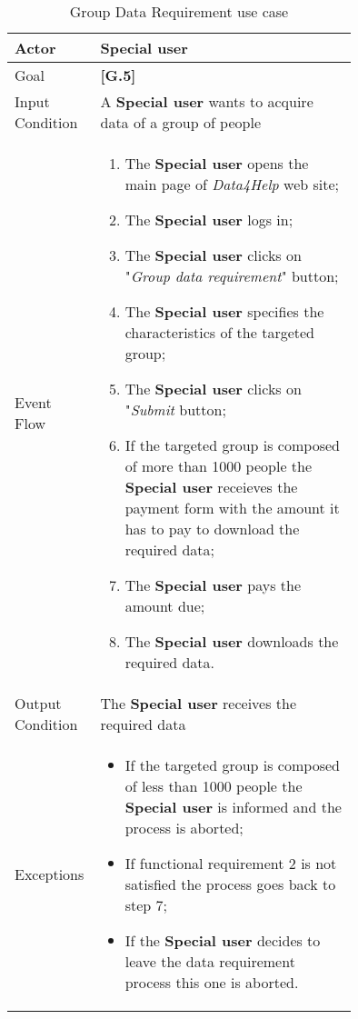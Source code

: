 \begin{center}
\begin{table}
\begin{tabular}{ | l | p{0.75\linewidth} | }
  \hline
    Actor & \textbf{Special user}\\ \hline
    Goal & \textbf{[G.5]} \\ \hline
    Input Condition & A \textbf{Special user} wants to acquire data of a group of people \\ \hline
    Event Flow & \begin{minipage}[t]{0.7\textwidth}
      \begin{enumerate}
        \item The \textbf{Special user} opens the main page of \textit{Data4Help} web site;
        \item The \textbf{Special user} logs in;
        \item The \textbf{Special user} clicks on "\textit{Group data requirement}" button;
        \item The \textbf{Special user} specifies the characteristics of the targeted group;
        \item The \textbf{Special user} clicks on "\textit{Submit} button;
        \item If the targeted group is composed of more than 1000 people the \textbf{Special user} receieves the payment form with the amount it has to pay to download the required data;
        \item The \textbf{Special user} pays the amount due;
        \item The \textbf{Special user} downloads the required data.
      \end{enumerate}
    \smallskip
  \end{minipage} \\ \hline
  Output Condition & The \textbf{Special user} receives the required data \\ \hline
  Exceptions & \begin{minipage}[t]{0.7\textwidth}
    \begin{itemize}
      \smallskip
      \item If the targeted group is composed of less than 1000 people the \textbf{Special user} is informed and the process is aborted;
      \item If functional requirement 2 is not satisfied the process goes back to step 7;
      \item If the \textbf{Special user} decides to leave the data requirement process this one is aborted.
    \end{itemize}
    \smallskip
  \end{minipage}  \\ \hline
\end{tabular}
\caption{Group Data Requirement use case}
\label{table:groupDataRequirement}
\end{table}
\end{center}
